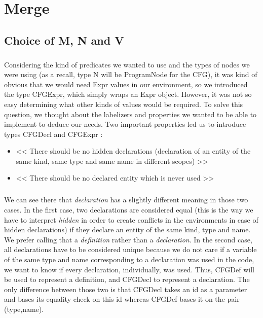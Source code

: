 \documentclass{report}
\begin{document}
\chapter{Merge}

\section{Choice of M, N and V}

\paragraph{}
\hspace{4mm}Considering the kind of predicates we wanted to use and the types of nodes we were using (as a recall, type N will be ProgramNode for the CFG), it was kind
of obvious that we would need Expr values in our environment, so we introduced the type CFGExpr, which simply wraps an Expr object. However, it was not so easy determining what other kinds
of values would be required. To solve this question, we thought about the labelizers and properties we wanted to be able to implement to deduce our needs. 
Two important properties led us to introduce types CFGDecl and CFGExpr :

\vspace{1.5mm}
\begin{itemize}
\item << There should be no hidden declarations  (declaration of an entity of the same kind, same type and same name in different scopes) >>\vspace{1mm}
\item << There should be no declared entity which is never used >>\vspace{1mm}
\end{itemize}

\paragraph{}
\hspace{4mm}We can see there that \textit{declaration} has a slightly different meaning in those two cases. In the first case,
two declarations are considered equal (this is the way we have to interpret \textit{hidden} in order to create conflicts in the environments in case
of hidden declarations) if they declare an entity of the same kind, type and 
name. We prefer calling that a \textit{definition} rather than a \textit{declaration}. In the second case,
all declarations have to be considered unique because we do not care if a variable of the same type and name corresponding to a declaration was used in the code,
we want to know if every declaration, individually, was used. Thus, CFGDef will be used to represent a definition, and CFGDecl to represent a declaration.
The only difference between those two is that CFGDecl takes an id as a parameter and bases its equality check on this id whereas CFGDef bases it on the pair (type,name).
\end{document}
